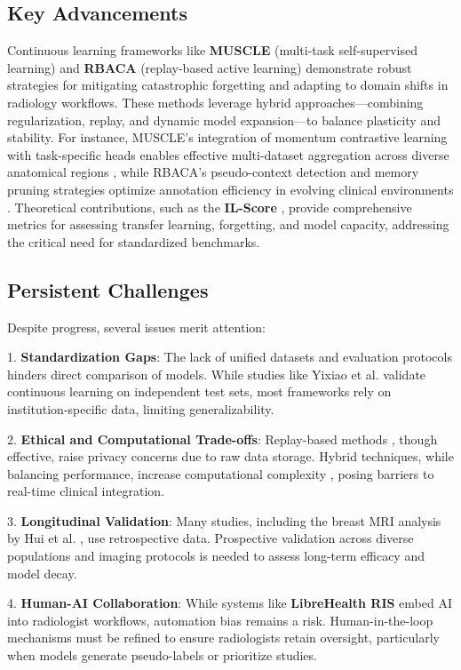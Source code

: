 \documentclass{IEEEcsmag}
\begin{document}
    \subsection{Key Advancements}
    Continuous learning frameworks like \textbf{MUSCLE} (multi-task self-supervised learning) \cite{cite-17} and \textbf{RBACA} (replay-based active learning) \cite{cite-19} demonstrate robust strategies for mitigating catastrophic forgetting and adapting to domain shifts in radiology workflows. 
    These methods leverage hybrid approaches—combining regularization, replay, and dynamic model expansion—to balance plasticity and stability. 
    For instance, MUSCLE’s integration of momentum contrastive learning with task-specific heads enables effective multi-dataset aggregation across diverse anatomical regions \cite{cite-17}, while RBACA’s pseudo-context detection and memory pruning strategies optimize annotation efficiency in evolving clinical environments \cite{cite-19}. 
    Theoretical contributions, such as the \textbf{IL-Score} \cite{cite-19}, provide comprehensive metrics for assessing transfer learning, forgetting, and model capacity, addressing the critical need for standardized benchmarks.
    
    \subsection{Persistent Challenges}
    Despite progress, several issues merit attention:
    
    1. \textbf{Standardization Gaps}: The lack of unified datasets and evaluation protocols hinders direct comparison of models. 
    While studies like Yixiao et al. \cite{cite-1} validate continuous learning on independent test sets, most frameworks rely on institution-specific data, limiting generalizability.
    
    2. \textbf{Ethical and Computational Trade-offs}: Replay-based methods \cite{cite-19}, though effective, raise privacy concerns due to raw data storage. 
    Hybrid techniques, while balancing performance, increase computational complexity \cite{cite-10}, posing barriers to real-time clinical integration.
    
    3. \textbf{Longitudinal Validation}: Many studies, including the breast MRI analysis by Hui et al. \cite{cite-21}, use retrospective data. 
    Prospective validation across diverse populations and imaging protocols is needed to assess long-term efficacy and model decay.
    
    4. \textbf{Human-AI Collaboration}: While systems like \textbf{LibreHealth RIS} \cite{cite-6} embed AI into radiologist workflows, automation bias remains a risk. 
    Human-in-the-loop mechanisms must be refined to ensure radiologists retain oversight, particularly when models generate pseudo-labels or prioritize studies.
    
\end{document}
